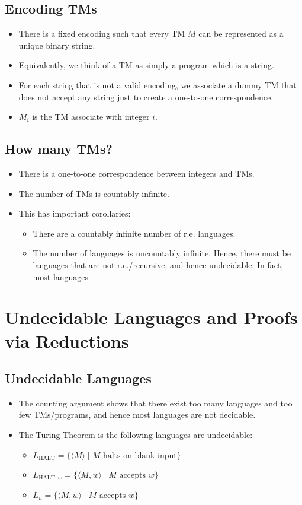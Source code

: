 \subsection{Encoding TMs}
\begin{itemize}
    \item There is a fixed encoding such that every TM $M$ can be represented as a unique binary string.
    \item Equivalently, we think of a TM as simply a program which is a string.
    \item For each string that is not a valid encoding, we associate a dummy TM that does not accept any string just to create a one-to-one correspondence.
    \item $M_i$ is the TM associate with integer $i$.
\end{itemize}

\subsection{How many TMs?}
\begin{itemize}
    \item There is a one-to-one correspondence between integers and TMs.
    \item The number of TMs is countably infinite.
    \item This has important corollaries:
    \begin{itemize}
        \item There are a countably infinite number of r.e. languages.
        \item The number of languages is uncountably infinite. Hence, there must be languages that are not r.e./recursive, and hence undecidable. In fact, most languages 
    \end{itemize}
\end{itemize}

\section{Undecidable Languages and Proofs via Reductions}

\subsection{Undecidable Languages}
\begin{itemize}
    \item The counting argument shows that there exist too many languages and too few TMs/programs, and hence most languages are not decidable.
    \item The Turing Theorem is the following languages are undecidable:
    \begin{itemize}
        \item $L_{\text{HALT}} = \{ \langle M \rangle \mid \text{$M$ halts on blank input} \}$
        \item $L_{\text{HALT}, w} = \{ \langle M, w \rangle \mid \text{$M$ accepts $w$} \}$
        \item $L_u = \{ \langle M, w \rangle \mid \text{$M$ accepts $w$} \}$
    \end{itemize}
\end{itemize}

